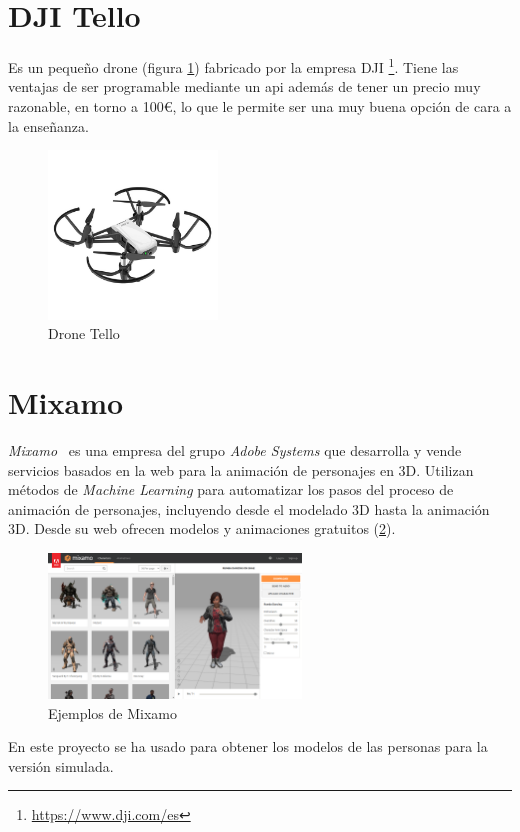 \section{DJI Tello}
Es un pequeño drone (figura \ref{fig:tello}) fabricado por la empresa DJI \footnote{\url{https://www.dji.com/es}}. Tiene las ventajas de ser programable mediante un \acrshort{api} además de tener un precio muy razonable, en torno a 100€, lo que le permite ser una muy buena opción de cara a la enseñanza.
\begin{figure}[H]
  \begin{center}
    \includegraphics[width=0.4\textwidth]{figures/herramientas/tello.png}
		\caption{Drone Tello}
		\label{fig:tello}
		\end{center}
\end{figure}
\section{Mixamo}\label{sec:mixamo}
\textit{Mixamo}~\cite{mixamo} es una empresa del grupo \textit{Adobe Systems} que desarrolla y vende servicios basados en la web para la animación de personajes en 3D. Utilizan métodos de \textit{Machine Learning} para automatizar los pasos del proceso de animación de personajes, incluyendo desde el modelado 3D hasta la animación 3D. Desde su web ofrecen modelos y animaciones gratuitos (\ref{fig.mixamo}).
\begin{figure}[H]
  \begin{center}
    \includegraphics[width=0.6\textwidth]{figures/herramientas/mixamo.png}
		\caption{Ejemplos de Mixamo}
		\label{fig.mixamo}
		\end{center}
\end{figure}
En este proyecto se ha usado para obtener los modelos de las personas para la versión simulada.
